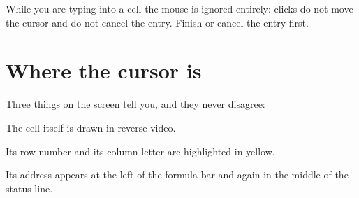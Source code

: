 While you are typing into a cell the mouse is ignored entirely: clicks do not
move the cursor and do not cancel the entry. Finish or cancel the entry first.

\section{Where the cursor is}

Three things on the screen tell you, and they never disagree:

\begin{ccsteps}
\item The cell itself is drawn in reverse video.
\item Its row number and its column letter are highlighted in yellow.
\item Its address appears at the left of the formula bar and again in the
middle of the status line.
\end{ccsteps}
